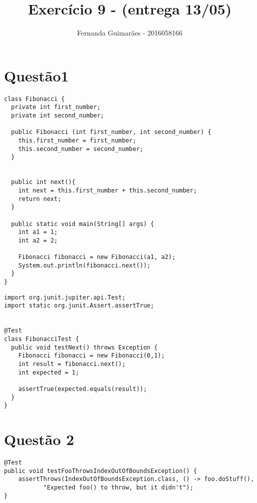 \documentclass[11pt]{article}
\author{Fernanda Guimarães - 2016058166}
\date{}
\title{Exercício 9 - (entrega 13/05)}
\begin{document}
\maketitle

\section*{Questão1}
\label{sec:org989dc8e}
\begin{verbatim}
class Fibonacci {
  private int first_number;
  private int second_number;

  public Fibonacci (int first_number, int second_number) {
    this.first_number = first_number;
    this.second_number = second_number;
  }


  public int next(){
    int next = this.first_number + this.second_number;
    return next;
  }

  public static void main(String[] args) {
    int a1 = 1;
    int a2 = 2;

    Fibonacci fibonacci = new Fibonacci(a1, a2);
    System.out.println(fibonacci.next());
  }
}

\end{verbatim}

\begin{verbatim}
import org.junit.jupiter.api.Test;
import static org.junit.Assert.assertTrue;


@Test
class FibonacciTest {
  public void testNext() throws Exception {
    Fibonacci fibonacci = new Fibonacci(0,1);
    int result = fibonacci.next();
    int expected = 1;

    assertTrue(expected.equals(result));
  }
}
\end{verbatim}
\section*{Questão 2}
\label{sec:org410dcd3}
\begin{verbatim}
@Test
public void testFooThrowsIndexOutOfBoundsException() {
    assertThrows(IndexOutOfBoundsException.class, () -> foo.doStuff(),
           "Expected foo() to throw, but it didn't");
}
\end{verbatim}
\end{document}
